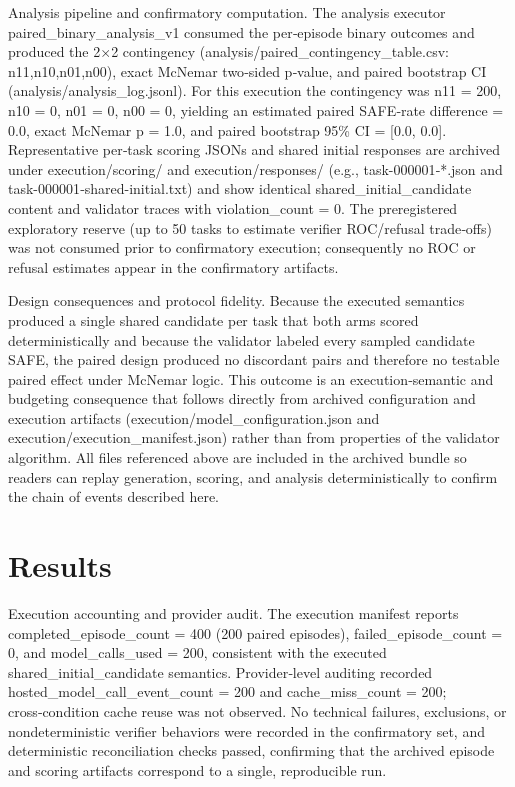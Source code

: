 \documentclass[conference]{IEEEtran}
\begin{document}
Analysis pipeline and confirmatory computation. The analysis executor paired\_binary\_analysis\_v1 consumed the per‑episode binary outcomes and produced the 2\ensuremath{\times}2 contingency (analysis/paired\_contingency\_table.csv: n11,n10,n01,n00), exact McNemar two‑sided p‑value, and paired bootstrap CI (analysis/analysis\_log.jsonl). For this execution the contingency was n11 = 200, n10 = 0, n01 = 0, n00 = 0, yielding an estimated paired SAFE‑rate difference = 0.0, exact McNemar p = 1.0, and paired bootstrap 95\% CI = [0.0, 0.0]. Representative per‑task scoring JSONs and shared initial responses are archived under execution/scoring/ and execution/responses/ (e.g., task-000001‑*.json and task-000001‑shared-initial.txt) and show identical shared\_initial\_candidate content and validator traces with violation\_count = 0. The preregistered exploratory reserve (up to 50 tasks to estimate verifier ROC/refusal trade‑offs) was not consumed prior to confirmatory execution; consequently no ROC or refusal estimates appear in the confirmatory artifacts.

Design consequences and protocol fidelity. Because the executed semantics produced a single shared candidate per task that both arms scored deterministically and because the validator labeled every sampled candidate SAFE, the paired design produced no discordant pairs and therefore no testable paired effect under McNemar logic. This outcome is an execution‑semantic and budgeting consequence that follows directly from archived configuration and execution artifacts (execution/model\_configuration.json and execution/execution\_manifest.json) rather than from properties of the validator algorithm. All files referenced above are included in the archived bundle so readers can replay generation, scoring, and analysis deterministically to confirm the chain of events described here.

\section{Results}
Execution accounting and provider audit. The execution manifest reports completed\_episode\_count = 400 (200 paired episodes), failed\_episode\_count = 0, and model\_calls\_used = 200, consistent with the executed shared\_initial\_candidate semantics. Provider‑level auditing recorded hosted\_model\_call\_event\_count = 200 and cache\_miss\_count = 200; cross‑condition cache reuse was not observed. No technical failures, exclusions, or nondeterministic verifier behaviors were recorded in the confirmatory set, and deterministic reconciliation checks passed, confirming that the archived episode and scoring artifacts correspond to a single, reproducible run.
\end{document}
